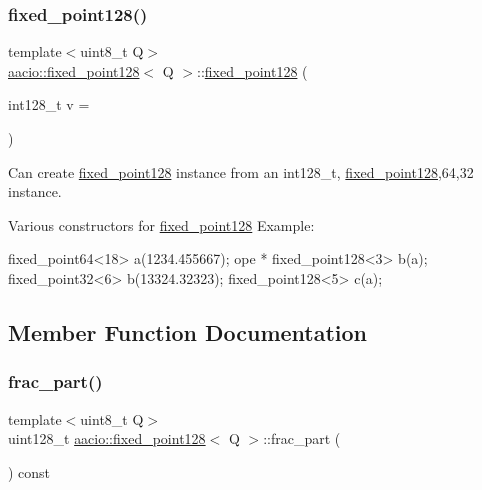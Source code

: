\subsubsection{\texorpdfstring{fixed\+\_\+point128()}{fixed\_point128()}}
{\footnotesize\ttfamily template$<$uint8\+\_\+t Q$>$ \\
\mbox{\hyperlink{structaacio_1_1fixed__point128}{aacio\+::fixed\+\_\+point128}}$<$ Q $>$\+::\mbox{\hyperlink{structaacio_1_1fixed__point128}{fixed\+\_\+point128}} (\begin{DoxyParamCaption}\item[{int128\+\_\+t}]{v = {} }\end{DoxyParamCaption})\hspace{0.3cm}{\ttfamily [inline]}}



Can create \mbox{\hyperlink{structaacio_1_1fixed__point128}{fixed\+\_\+point128}} instance from an int128\+\_\+t, \mbox{\hyperlink{structaacio_1_1fixed__point128}{fixed\+\_\+point128}},64,32 instance. 

Various constructors for \mbox{\hyperlink{structaacio_1_1fixed__point128}{fixed\+\_\+point128}} Example\+: 
\begin{DoxyCode}
          fixed\_point64<18> a(1234.455667);
ope        * fixed\_point128<3> b(a);
          fixed\_point32<6> b(13324.32323);
          fixed\_point128<5> c(a);
\end{DoxyCode}
 

\subsection{Member Function Documentation}
\mbox{\label{structaacio_1_1fixed__point128_a8bc9ccd0701b48ce4642a833d8536406}} 
\subsubsection{\texorpdfstring{frac\+\_\+part()}{frac\_part()}}
{\footnotesize\ttfamily template$<$uint8\+\_\+t Q$>$ \\
uint128\+\_\+t \mbox{\hyperlink{structaacio_1_1fixed__point128}{aacio\+::fixed\+\_\+point128}}$<$ Q $>$\+::frac\+\_\+part (\begin{DoxyParamCaption}{ }\end{DoxyParamCaption}) const\hspace{0.3cm}{\ttfamily [inline]}}



